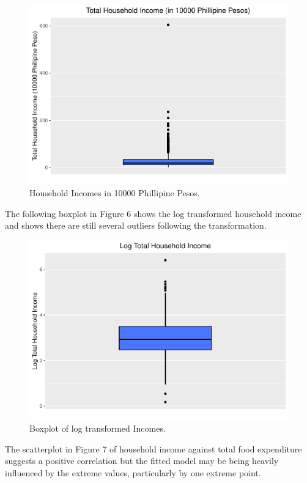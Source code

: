\documentclass[
]{article}
\begin{document}
\begin{figure}[H]

{\centering \includegraphics[width=0.8\linewidth]{Group_01_Project2_demo_files/figure-latex/balance boxplot-1} 

}

\caption{Household Incomes in 10000 Phillipine Pesos.}\label{fig:balance boxplot}
\end{figure}

The following boxplot in Figure 6 shows the log transformed household
income and shows there are still several outliers following the
transformation.

\begin{figure}[H]

{\centering \includegraphics[width=0.8\linewidth]{Group_01_Project2_demo_files/figure-latex/balance boxplot2-1} 

}

\caption{Boxplot of log transformed Incomes.}\label{fig:balance boxplot2}
\end{figure}

The scatterplot in Figure 7 of household income against total food
expenditure suggests a positive correlation but the fitted model may be
being heavily influenced by the extreme values, particularly by one
extreme point.
\end{document}

